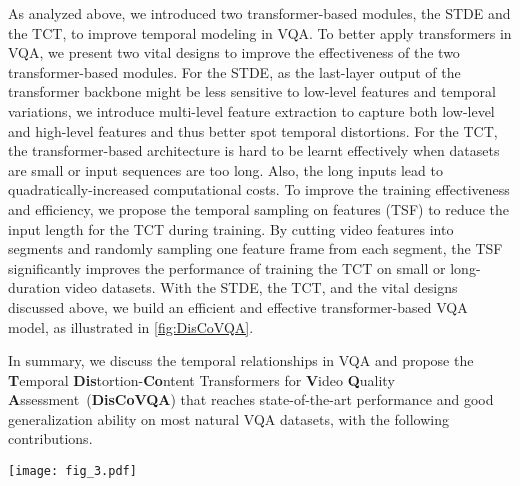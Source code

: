 \documentclass[journal]{IEEEtran}
\begin{document}
As analyzed above, we introduced two transformer-based modules, the STDE and the TCT, to improve temporal modeling in VQA. To better apply transformers in VQA, we present two vital designs to improve the effectiveness of the two transformer-based modules. For the STDE, as the last-layer output of the transformer backbone 
might be less sensitive to low-level features and temporal variations, we introduce multi-level feature extraction to capture both low-level and high-level features and thus better spot temporal distortions. For the TCT, the transformer-based architecture is hard to be learnt effectively when datasets are small or input sequences are too long. Also, the long inputs lead to quadratically-increased computational costs. To improve the training effectiveness and efficiency, we propose the temporal sampling on features (TSF) to reduce the input length for the TCT during training. By cutting video features into segments and randomly sampling one feature frame from each segment, the TSF significantly improves the performance of training the TCT on small or long-duration video datasets. With the STDE, the TCT, and the vital designs discussed above, we build an efficient and effective transformer-based VQA model, as illustrated in \cref{fig:DisCoVQA}.







 In summary, we discuss the temporal relationships in VQA and propose the \textbf{T}emporal \textbf{Dis}tortion-\textbf{Co}ntent Transformers for \textbf{V}ideo \textbf{Q}uality \textbf{A}ssessment~(\textbf{DisCoVQA}) that reaches state-of-the-art performance and good generalization ability on most natural VQA datasets, with the following contributions.

\begin{figure*}[t]
    \centering
    \texttt{[image: fig\_3.pdf]}
    \caption{The structure of proposed Temporal Distortion-Content Transformers for Video Quality Assessment (\textbf{DisCoVQA}). It contains the Spatial-Temporal Distortion Extraction (STDE, \cref{sec:31}) to better extract temporal distortions (such as \textit{shaking, flicker, unsmooth transitions}), and the Temporal Content Transformer (TCT, \cref{sec:32}) to learn the content-related temporal quality attention between frames.}
    \label{fig:DisCoVQA}
\end{figure*}
\end{document}
